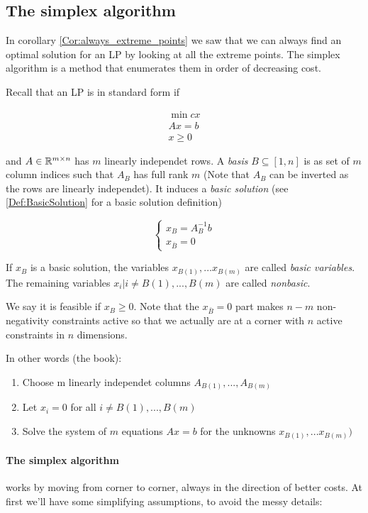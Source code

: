 \subsection{The simplex algorithm}

In corollary \ref{Cor:always_extreme_points} we saw that we can always find an optimal solution for an LP by looking at all the extreme points. The simplex algorithm is a method that enumerates them in order of decreasing cost. 

Recall that an LP is in standard form if

\begin{align*}
\min cx\\
Ax = b\\
x\geq 0
\end{align*}

and $A\in \mathbb{R}^{m\times n}$ has $m$ linearly independet rows. A \emph{basis} $B\subseteq [1,n]$ is as set of $m$ column indices such that $A_B$ has full rank $m$ (Note that $A_B$ can be inverted as the rows are linearly independet). It induces a \emph{basic solution} (see \ref{Def:BasicSolution} for a basic solution definition)

\[\begin{cases} x_B = A^{-1}_Bb\\ x_{\bar B} = 0\end{cases}\]

If $x_B$ is a basic solution, the variables $x_{B(1)},...x_{B(m)}$ are called \emph{basic variables}. The remaining variables $x_i|i \neq B(1),...,B(m)$ are called \emph{nonbasic}. 

We say it is feasible if $x_B\geq 0$. Note that the $x_{\bar B}=0$ part makes $n-m$ non-negativity constraints active so that we actually are at a corner with $n$ active constraints in $n$ dimensions.

In other words (the book):
\begin{enumerate}
 \item Choose m linearly independet columns $A_{B(1)},...,A_{B(m)}$
 \item Let $x_i=0$ for all $i \neq B(1),...,B(m)$
 \item Solve the system of $m$ equations $Ax=b$ for the unknowns $x_{B(1)},...x_{B(m)})$
\end{enumerate}

\paragraph*{The simplex algorithm} works by moving from corner to corner, always in the direction of better costs. At first we'll have some simplifying assumptions, to avoid the messy details:

